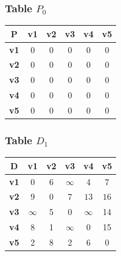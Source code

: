 \documentclass{beamer}
\begin{document}
\begin{frame}
\frametitle{Table $P_{0}$}
\begin{center}
    \begin{tabular}{|c||c|c|c|c|c|}
        \hline
        \textbf{P} & \textbf{v1} & \textbf{v2} & \textbf{v3} & \textbf{v4} & \textbf{v5} \\
        \hline
        \hline
        \textbf{v1}& 0 & 0 & 0 & 0 & 0 \\
        \hline
        \textbf{v2}& 0 & 0 & 0 & 0 & 0 \\
        \hline
        \textbf{v3}& 0 & 0 & 0 & 0 & 0 \\
        \hline
        \textbf{v4}& 0 & 0 & 0 & 0 & 0 \\
        \hline
        \textbf{v5}& 0 & 0 & 0 & 0 & 0 \\
        \hline
    \end{tabular}
\end{center}


\end{frame}





\begin{frame}
\frametitle{Table $D_{1}$}
\begin{center}
    \begin{tabular}{|c||c|c|c|c|c|}
        \hline
        \textbf{D} & \textbf{v1} & \textbf{v2} & \textbf{v3} & \textbf{v4} & \textbf{v5} \\
        \hline
        \hline
        \textbf{v1}& 0 & 6 & $\infty$ & 4 & 7 \\
        \hline
        \textbf{v2}& 9 & 0 & 7 & \cellcolor[HTML]{D74894}$13$ & \cellcolor[HTML]{D74894}$16$ \\
        \hline
        \textbf{v3}& $\infty$ & 5 & 0 & $\infty$ & 14 \\
        \hline
        \textbf{v4}& 8 & 1 & $\infty$ & 0 & 15 \\
        \hline
        \textbf{v5}& 2 & \cellcolor[HTML]{D74894}$8$ & 2 & \cellcolor[HTML]{D74894}$6$ & 0 \\
        \hline
    \end{tabular}
\end{center}


\end{frame}
\end{document}
